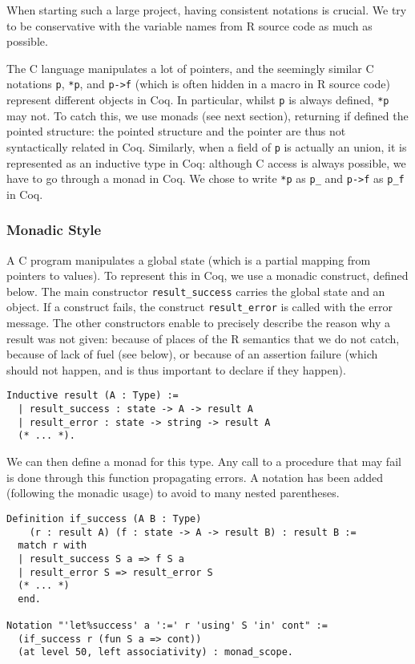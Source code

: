 \documentclass{article}
\newcommand\Coq{Coq}
\newcommand\R{R}
\newcommand\Cn{C}
\begin{document}
When starting such a large project,
having consistent notations is crucial.
We try to be conservative with the variable names from
\R{} source code as much as possible.

The \Cn{} language manipulates a lot of pointers,
and the seemingly similar \Cn{} notations \texttt{p},
\texttt{*p}, and \texttt{p->f}
(which is often hidden in a macro in \R{} source code)
represent different objects in \Coq{}.
In particular, whilst \texttt{p} is always defined,
\texttt{*p} may not.
To catch this, we use monads (see next section),
returning if defined the pointed structure:
the pointed structure and the pointer are thus not
syntactically related in \Coq{}.
Similarly, when a field of \texttt{p} is actually an union,
it is represented as an inductive type in \Coq{}:
although \Cn{} access is always possible,
we have to go through a monad in \Coq{}.
We chose to write \texttt{*p} as \texttt{p_}
and \texttt{p->f} as \texttt{p_f} in \Coq{}.


\subsubsection{Monadic Style}
\label{sec:monadic:style}

A \Cn{} program manipulates a global state
(which is a partial mapping from pointers to values).
To represent this in \Coq{}, we use a monadic construct, defined below.
The main constructor \texttt{result_success}
carries the global state and an object.
If a construct fails,
the construct \texttt{result_error}
is called with the error message.
The other constructors enable to precisely describe
the reason why a result was not given:
because of places of the \R{} semantics that we do not catch,
because of lack of fuel (see below),
or because of an assertion failure
(which should not happen,
and is thus important to declare if they happen).
\begin{verbatim}
Inductive result (A : Type) :=
  | result_success : state -> A -> result A
  | result_error : state -> string -> result A
  (* ... *).
\end{verbatim}

We can then define a monad for this type.
Any call to a procedure that may fail
is done through this function
propagating errors.
A notation has been added
(following the monadic usage)
to avoid to many nested parentheses.
\begin{verbatim}
Definition if_success (A B : Type)
    (r : result A) (f : state -> A -> result B) : result B :=
  match r with
  | result_success S a => f S a
  | result_error S => result_error S
  (* ... *)
  end.

Notation "'let%success' a ':=' r 'using' S 'in' cont" :=
  (if_success r (fun S a => cont))
  (at level 50, left associativity) : monad_scope.
\end{verbatim}
\end{document}
